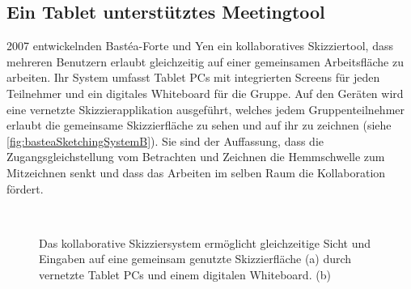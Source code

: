 \subsection{Ein Tablet unterstütztes Meetingtool}
2007 entwickelnden Bastéa-Forte und Yen ein kollaboratives Skizziertool, dass mehreren Benutzern erlaubt gleichzeitig auf einer gemeinsamen Arbeitsfläche zu arbeiten. Ihr System umfasst Tablet PCs mit integrierten Screens für jeden Teilnehmer und ein digitales Whiteboard für die Gruppe. Auf den Geräten wird eine vernetzte Skizzierapplikation ausgeführt, welches jedem Gruppenteilnehmer erlaubt die gemeinsame Skizzierfläche zu sehen und auf ihr zu zeichnen (siehe \autoref{fig:basteaSketchingSystemB}). Sie sind der Auffassung, dass die Zugangsgleichstellung vom Betrachten und Zeichnen die Hemmschwelle zum Mitzeichnen senkt und dass das Arbeiten im selben Raum die Kollaboration fördert. 

\begin{figure}
        \myfloatalign
         \quad
         \\
        \caption[Das kollaborative Skizziersystem \newline \citep{BasteaForte:2007}]{Das kollaborative Skizziersystem ermöglicht gleichzeitige Sicht und Eingaben auf eine gemeinsam genutzte Skizzierfläche (a) durch vernetzte Tablet PCs und einem digitalen Whiteboard. (b) }\label{fig:basteaSketchingSystemB}
\end{figure}

